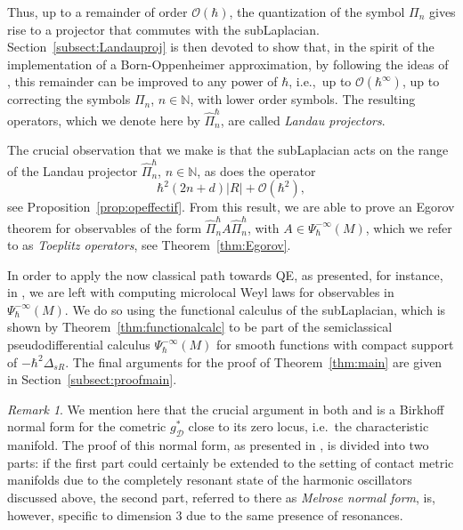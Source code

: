 \documentclass[12pt,a4paper]{amsart}
\theoremstyle{plain}
\theoremstyle{definition}
\theoremstyle{remark}
\newtheorem{remark}[theorem]{Remark}
\numberwithin{equation}{section}
\theoremstyle{definition}
\def\N{{\mathbb N}}%
\def \O{\mathscr{O}}
\def \cD{\mathcal{D}}
\numberwithin{equation}{section}
\begin{document}
Thus, up to a remainder of order $\O(\hbar)$, the quantization of the symbol $\Pi_n$ gives rise to a projector that commutes with the subLaplacian. Section~\ref{subsect:Landauproj} is then devoted to show that, in the spirit of the implementation of a Born-Oppenheimer approximation, by following the ideas of \cite{BFKRV}, this remainder can be improved to any power of $\hbar$, i.e.,~up to $\O(\hbar^\infty)$, up to correcting the symbols $\Pi_n$, $n\in\N$, with lower order symbols. The resulting operators, which we denote here by $\hat{\Pi}_n^\hbar$, are called \emph{Landau projectors}.

\vspace{0.25cm}

The crucial observation that we make is that the subLaplacian acts on the range of the Landau projector $\hat{\Pi}_n^\hbar$, $n\in\N$, as does the operator
\begin{equation*}
    \hbar^2(2n+d)|R| + \O(\hbar^2),
\end{equation*}
see Proposition~\ref{prop:opeffectif}. From this result, we are able to prove an Egorov theorem for observables of the form $\hat{\Pi}_n^\hbar A \hat{\Pi}_n^\hbar$, with $A\in\Psi_\hbar^{-\infty}(M)$, which we refer to as \emph{Toeplitz operators}, see Theorem~\ref{thm:Egorov}.

\vspace{0.25cm}

In order to apply the now classical path towards QE, as presented, for instance, in \cite{An}, we are left with computing microlocal Weyl laws for observables in $\Psi_\hbar^{-\infty}(M)$. We do so using the functional calculus of the subLaplacian, which is shown by Theorem~\ref{thm:functionalcalc} to be part of the semiclassical pseudodifferential calculus $\Psi_\hbar^{-\infty}(M)$ for smooth functions with compact support of $-\hbar^2\Delta_{sR}$. The final arguments for the proof of Theorem~\ref{thm:main} are given in Section~\ref{subsect:proofmain}.
 
\begin{remark}
    We mention here that the crucial argument in both \cite{AR} and \cite{CdVHT18} is a Birkhoff normal form for the cometric $g_\cD^*$ close to its zero locus, i.e.~the characteristic manifold. The proof of this normal form, as presented in \cite[Appendix C]{CdVHT18}, is divided into two parts: if the first part could certainly be extended to the setting of contact metric manifolds due to the completely resonant state of the harmonic oscillators discussed above, the second part, referred to there as \emph{Melrose normal form}, is, however, specific to dimension 3 due to the same presence of resonances.
\end{remark}
\end{document}
